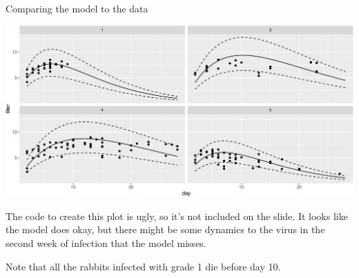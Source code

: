 \documentclass[
  ignorenonframetext,
]{beamer}
\begin{document}
\begin{frame}{Comparing the model to the data}
\protect\hypertarget{comparing-the-model-to-the-data}{}

\includegraphics{intro_Bayes_files/figure-beamer/unnamed-chunk-22-1.pdf}

The code to create this plot is ugly, so it's not included on the slide.
It looks like the model does okay, but there might be some dynamics to
the virus in the second week of infection that the model misses.

Note that all the rabbits infected with grade 1 die before day 10.

\end{frame}
\end{document}

